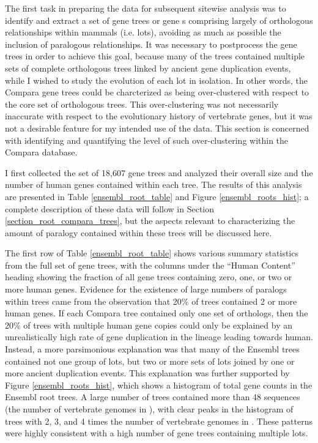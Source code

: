 The first task in preparing the \cmp data for subsequent sitewise
analysis was to identify and extract a set of gene trees or gene
\subtr{}s comprising largely of orthologous relationships within
mammals (i.e. \acp{lot}), avoiding as much as possible the inclusion
of paralogous relationships. It was necessary to postprocess the \cmp
gene trees in order to achieve this goal, because many of the \cmp
trees contained multiple sets of complete \mammln orthologous trees
linked by ancient gene duplication events, while I wished to study the
evolution of each \mammln \ac{lot} in isolation. In other words, the
Compara gene trees could be charcterized as being over-clustered with
respect to the core set of \mammln orthologous trees. This
over-clustering was not necessarily inaccurate with respect to the
evolutionary history of vertebrate genes, but it was not a desirable
feature for my intended use of the data. This section is concerned
with identifying and quantifying the level of such over-clustering
within the Compara database.

I first collected the set of 18,607 \cmp gene trees and analyzed their
overall size and the number of human genes contained within each
tree. The results of this analysis are presented in Table
\ref{ensembl_root_table} and Figure \ref{ensembl_roots_hist}; a
complete description of these data will follow in Section
\ref{section_root_compara_trees}, but the aspects relevant to
characterizing the amount of paralogy contained within these trees
will be discussed here.

The first row of Table \ref{ensembl_root_table} shows various summary
statistics from the full set of \cmp gene trees, with the columns
under the ``Human Content'' heading showing the fraction of all gene
trees containing zero, one, or two or more human genes. Evidence for
the existence of large numbers of paralogs within \cmp trees came from
the observation that 20\% of \cmp trees contained 2 or more human
genes. If each Compara tree contained only one set of \mammln
orthologs, then the 20\% of trees with multiple human gene copies
could only be explained by an unrealistically high rate of gene
duplication in the lineage leading towards human. Instead, a more
parsimonious explanation was that many of the Ensembl trees contained
not one group of \mammln \acp{lot}, but two or more sets of \mammln
\acp{lot} joined by one or more ancient duplication events. This
explanation was further supported by Figure \ref{ensembl_roots_hist},
which shows a histogram of total gene counts in the Ensembl root
trees. A large number of trees contained more than 48 sequences (the
number of vertebrate genomes in \ens), with clear peaks in the
histogram of trees with 2, 3, and 4 times the number of vertebrate
genomes in \ens. These patterns were highly consistent with a high
number of \cmp gene trees containing multiple \mammln \acp{lot}.

